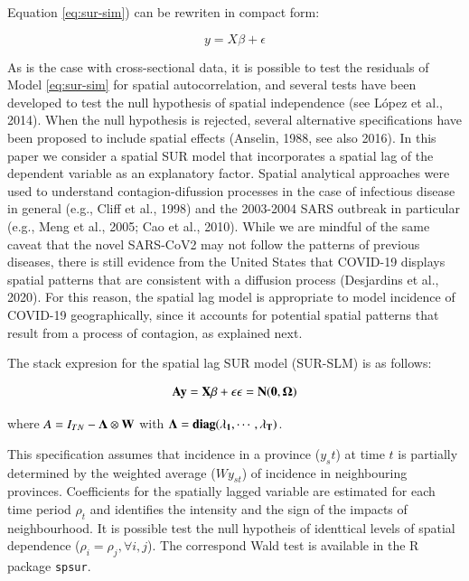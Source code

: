 \documentclass[]{elsarticle} %
\begin{document}
Equation \ref{eq:sur-sim}) can be rewriten in compact form:

\begin{equation}
y = X \beta + \epsilon
\end{equation}

As is the case with cross-sectional data, it is possible to test the
residuals of Model \ref{eq:sur-sim} for spatial autocorrelation, and
several tests have been developed to test the null hypothesis of spatial
independence (see López et al., 2014). When the null hypothesis is
rejected, several alternative specifications have been proposed to
include spatial effects (Anselin, 1988, see also 2016). In this paper we
consider a spatial SUR model that incorporates a spatial lag of the
dependent variable as an explanatory factor. Spatial analytical
approaches were used to understand contagion-difussion processes in the
case of infectious disease in general (e.g., Cliff et al., 1998) and the
2003-2004 SARS outbreak in particular (e.g., Meng et al., 2005; Cao et
al., 2010). While we are mindful of the same caveat that the novel
SARS-CoV2 may not follow the patterns of previous diseases, there is
still evidence from the United States that COVID-19 displays spatial
patterns that are consistent with a diffusion process (Desjardins et
al., 2020). For this reason, the spatial lag model is appropriate to
model incidence of COVID-19 geographically, since it accounts for
potential spatial patterns that result from a process of contagion, as
explained next.

The stack expresion for the spatial lag SUR model (SUR-SLM) is as
follows:

\begin{equation}
\label{eq:sur-slm}
\bf{A}y = X \beta + \epsilon \\
\epsilon =N(0,\Omega)
\end{equation}

\noindent where \(A =I_{TN}-\bf{\Lambda} \otimes W\) with
\(\bf{\Lambda} = diag(\lambda_1, \cdots, \lambda_T)\).

This specification assumes that incidence in a province (\(y_st\)) at
time \(t\) is partially determined by the weighted average (\(Wy_{st}\))
of incidence in neighbouring provinces. Coefficients for the spatially
lagged variable are estimated for each time period \(\rho_t\) and
identifies the intensity and the sign of the impacts of neighbourhood.
It is possible test the null hypotheis of identtical levels of spatial
dependence (\(\rho_i=\rho_j, \forall i,j\)). The correspond Wald test is
available in the R package \texttt{spsur}.
\end{document}
